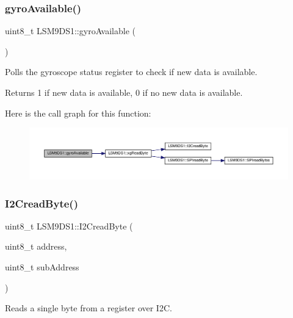 \subsubsection{\texorpdfstring{gyro\+Available()}{gyroAvailable()}}
{\footnotesize\ttfamily uint8\+\_\+t L\+S\+M9\+D\+S1\+::gyro\+Available (\begin{DoxyParamCaption}{ }\end{DoxyParamCaption})}



Polls the gyroscope status register to check if new data is available. 

\begin{DoxyReturn}{Returns}
1 if new data is available, 0 if no new data is available. 
\end{DoxyReturn}
Here is the call graph for this function\+:
\nopagebreak
\begin{figure}[H]
\begin{center}
\leavevmode
\includegraphics[width=350pt]{classLSM9DS1_a65b71a03a30f4e8ed1ffd46de3db0560_cgraph}
\end{center}
\end{figure}
\mbox{\label{classLSM9DS1_a7fc046d4b335494331905fdeb5c81c9e}} 
\subsubsection{\texorpdfstring{I2\+Cread\+Byte()}{I2CreadByte()}}
{\footnotesize\ttfamily uint8\+\_\+t L\+S\+M9\+D\+S1\+::\+I2\+Cread\+Byte (\begin{DoxyParamCaption}\item[{uint8\+\_\+t}]{address,  }\item[{uint8\+\_\+t}]{sub\+Address }\end{DoxyParamCaption})\hspace{0.3cm}{\ttfamily [protected]}}



Reads a single byte from a register over I2C. 


